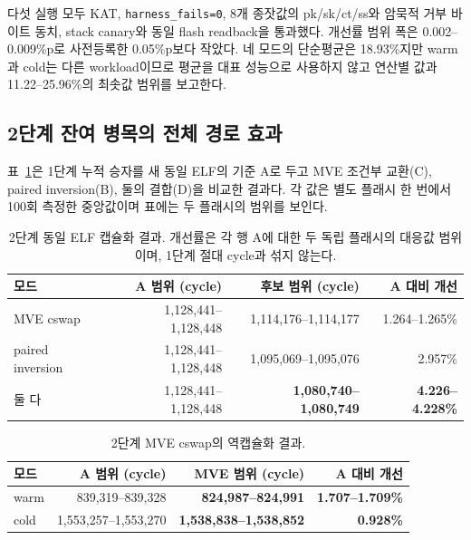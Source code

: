 \documentclass[runningheads,orivec]{llncs}
\begin{document}
다섯 실행 모두 KAT, \texttt{harness\_fails=0}, 8개 종잣값의 pk/sk/ct/ss와
암묵적 거부 바이트 동치, stack canary와 동일 flash readback을 통과했다. 개선률
범위 폭은 0.002--0.009\%p로 사전등록한 0.05\%p보다 작았다. 네 모드의 단순평균은
18.93\%지만 warm과 cold는 다른 workload이므로 평균을 대표 성능으로 사용하지 않고
연산별 값과 11.22--25.96\%의 최솟값 범위를 보고한다.

\subsection{2단계 잔여 병목의 전체 경로 효과}\label{sec:residual}

표~\ref{tab:residual}은 1단계 누적 승자를 새 동일 ELF의 기준 A로 두고 MVE 조건부
교환(C), paired inversion(B), 둘의 결합(D)을 비교한 결과다. 각 값은 별도 플래시 한
번에서 100회 측정한 중앙값이며 표에는 두 플래시의 범위를 보인다.

\begin{table}[H]\centering\footnotesize
\caption{2단계 동일 ELF 캡슐화 결과. 개선률은 각 행 A에 대한 두 독립 플래시의
대응값 범위이며, 1단계 절대 cycle과 섞지 않는다.}
\label{tab:residual}
\setlength{\tabcolsep}{2.5pt}
\begin{tabular}{lrrr}\toprule
모드 & A 범위 (cycle) & 후보 범위 (cycle) & A 대비 개선\\\midrule
MVE cswap & 1,128,441--1,128,448 & 1,114,176--1,114,177 & 1.264--1.265\%\\
paired inversion & 1,128,441--1,128,448 & 1,095,069--1,095,076 & 2.957\%\\
둘 다 & 1,128,441--1,128,448 & \textbf{1,080,740--1,080,749} & \textbf{4.226--4.228\%}\\\bottomrule
\end{tabular}
\end{table}
\begin{table}[H]\centering\footnotesize
\caption{2단계 MVE cswap의 역캡슐화 결과.}
\label{tab:residual-decaps}
\setlength{\tabcolsep}{3.0pt}
\begin{tabular}{lrrr}\toprule
모드 & A 범위 (cycle) & MVE 범위 (cycle) & A 대비 개선\\\midrule
warm & 839,319--839,328 & \textbf{824,987--824,991} & \textbf{1.707--1.709\%}\\
cold & 1,553,257--1,553,270 & \textbf{1,538,838--1,538,852} & \textbf{0.928\%}\\\bottomrule
\end{tabular}
\end{table}
\FloatBarrier
\end{document}
